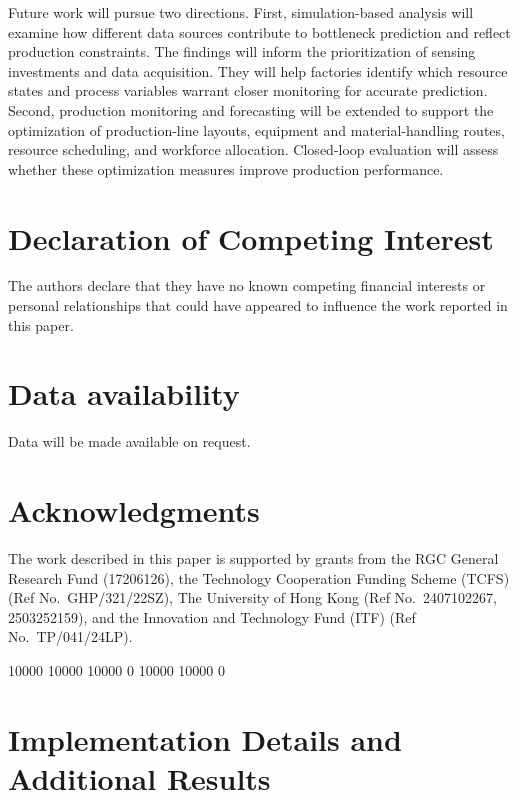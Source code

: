 \documentclass[a4paper,fleqn]{cas-dc}
\begin{document}
Future work will pursue two directions. First, simulation-based analysis will examine how different data sources contribute to bottleneck prediction and reflect production constraints. The findings will inform the prioritization of sensing investments and data acquisition. They will help factories identify which resource states and process variables warrant closer monitoring for accurate prediction. Second, production monitoring and forecasting will be extended to support the optimization of production-line layouts, equipment and material-handling routes, resource scheduling, and workforce allocation. Closed-loop evaluation will assess whether these optimization measures improve production performance.

\printcredits

\section*{Declaration of Competing Interest}
The authors declare that they have no known competing financial interests or personal relationships that could have appeared to influence the work reported in this paper.

\section*{Data availability}
Data will be made available on request.

\section*{Acknowledgments}
The work described in this paper is supported by grants from the RGC General Research Fund (17206126), the Technology Cooperation Funding Scheme (TCFS) (Ref No.\ GHP/321/22SZ), The University of Hong Kong (Ref No.\ 2407102267, 2503252159), and the Innovation and Technology Fund (ITF) (Ref No.\ TP/041/24LP).




\par\medskip
\appendix
 10000 10000 10000 0
 10000 10000 0
\renewcommand{\dblfloatpagefraction}{0.7}
\section{Implementation Details and Additional Results}\label{app:additional}
\end{document}
